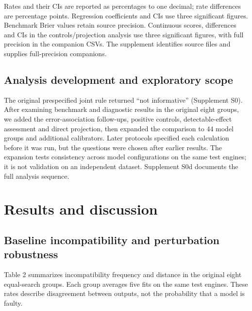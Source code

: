 \documentclass[IJPHM, 2026, 0]{phmsociety}
\begin{document}
Rates and their CIs are reported as percentages to one decimal; rate differences are percentage points. Regression coefficients and CIs use three significant figures. Benchmark Brier values retain source precision. Continuous scores, differences and CIs in the controls/projection analysis use three significant figures, with full precision in the companion CSVs. The supplement identifies source files and supplies full-precision companions.

\subsection{Analysis development and exploratory scope}\label{analysis-development-and-exploratory-scope}

The original prespecified joint rule returned ``not informative'' (Supplement S0). After examining benchmark and diagnostic results in the original eight groups, we added the error-association follow-ups, positive controls, detectable-effect assessment and direct projection, then expanded the comparison to \mbox{44} model groups and additional calibrators. Later protocols specified each calculation before it was run, but the questions were chosen after earlier results. The expansion tests consistency across model configurations on the same test engines; it is not validation on an independent dataset. Supplement S0d documents the full analysis sequence.

\section{Results and discussion}

\subsection{Baseline incompatibility and perturbation robustness}\label{baseline-incompatibility-and-perturbation-robustness}

Table \mbox{2} summarizes incompatibility frequency and distance in the original eight equal-search groups. Each group averages five fits on the same test engines. These rates describe disagreement between outputs, not the probability that a model is faulty.
\end{document}
